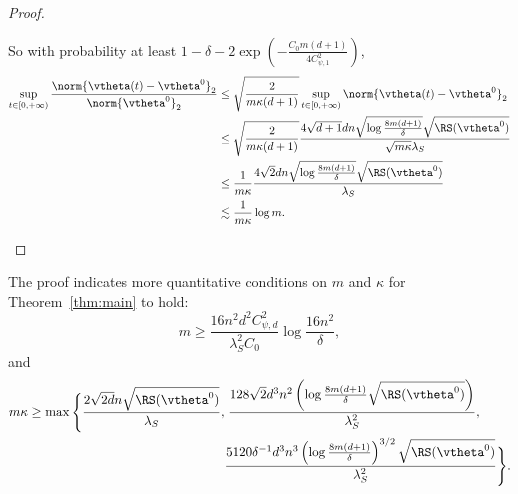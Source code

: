 \documentclass{article}
\begin{document}
\begin{proof}
\begin{enumerate}[(a)]
              So with probability at least $1-\delta-2\exp\left(-\frac{C_0m(d+1)}{4C^2_{\psi,1}}\right)$,
              \begin{equation}
                  \begin{aligned}
                      \sup\limits_{t\in[0,+\infty)}\frac{\norm{\vtheta(t)-\vtheta^0}_2}{\norm{\vtheta^0}_2}
                       & \leq \sqrt{\frac{2}{m\kappa(d+1)}}\sup\limits_{t\in[0,+\infty)}\norm{\vtheta(t)-\vtheta^0}_2                                            \\
                       & \leq  \sqrt{\frac{2}{m\kappa(d+1)}} \frac{4\sqrt{d+1}dn\sqrt{\log\frac{8m(d+1)}{\delta}}\sqrt{\RS(\vtheta^0)}}{\sqrt{m\kappa}\lambda_S} \\
                       & \leq \frac{1}{m\kappa}\frac{4\sqrt{2}dn\sqrt{\log\frac{8m(d+1)}{\delta}}\sqrt{\RS(\vtheta^0)}}{\lambda_S}                               \\
                       & \lesssim \frac{1}{m\kappa}\log m.
                  \end{aligned}
              \end{equation}
    \end{enumerate}
\end{proof}
\begin{rmk}
    The proof indicates more quantitative conditions on $m$ and $\kappa$ for Theorem~\ref{thm:main} to hold:
    \begin{equation}
        m\geq \frac{16n^2d^2C_{\psi,d}^2}{\lambda_S^2C_0}\log\frac{16n^2}{\delta},
    \end{equation}
    and
    \begin{equation}
        \begin{aligned}
            m\kappa\geq\max\Bigg\{\frac{2\sqrt{2d}n\sqrt{\RS(\vtheta^0)}}{\lambda_S}, & \;\frac{128\sqrt{2}d^3n^2\left(\log\frac{8m(d+1)}{\delta}\sqrt{\RS(\vtheta^0)}\right)}{\lambda_S^2},                \\
                                                                                      & \frac{5120\delta^{-1}d^3n^3\left(\log\frac{8m(d+1)}{\delta}\right)^{3/2}\sqrt{\RS(\vtheta^0)}}{\lambda_S^2}\Bigg\}.
        \end{aligned}
    \end{equation}
\end{rmk}
\end{document}
